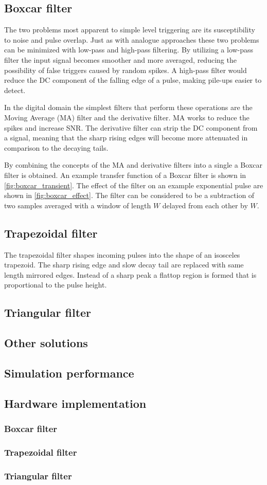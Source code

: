 \subsection{Boxcar filter}

The two problems most apparent to simple level triggering 
are its susceptibility to noise and pulse overlap.
Just as with analogue approaches these two problems 
can be minimized with low-pass and high-pass filtering.
By utilizing a low-pass filter the input signal becomes 
smoother and more averaged, reducing the possibility of 
false triggers caused by random spikes. A high-pass filter
would reduce the DC component of the falling edge of a pulse,
making pile-ups easier to detect.


In the digital domain the simplest filters that perform
these operations are the Moving Average (MA) filter and 
the derivative filter. MA works to reduce the spikes and increase 
SNR. The derivative filter can strip the DC component from
a signal, meaning that the sharp rising edges will become
more attenuated in comparison to the decaying tails.


By combining the concepts of the MA and derivative filters
into a single a Boxcar filter is obtained. An example transfer
function of a Boxcar filter is shown in \autoref{fig:boxcar_transient}.
The effect of the filter on an example exponential pulse are shown 
in \autoref{fig:boxcar_effect}. The filter can be considered
to be a subtraction of two samples averaged with a window
of length $W$ delayed from each other by $W$.



\subsection{Trapezoidal filter}
The trapezoidal filter shapes incoming pulses into the 
shape of an isosceles trapezoid. The sharp rising edge and 
slow decay tail are replaced with same length mirrored edges.
Instead of a sharp peak a flattop region is formed that is proportional
to the pulse height.
\subsection{Triangular filter}
\subsection{Other solutions}
\subsection{Simulation performance}
\subsection{Hardware implementation}
\subsubsection{Boxcar filter}
\subsubsection{Trapezoidal filter}
\subsubsection{Triangular filter}

